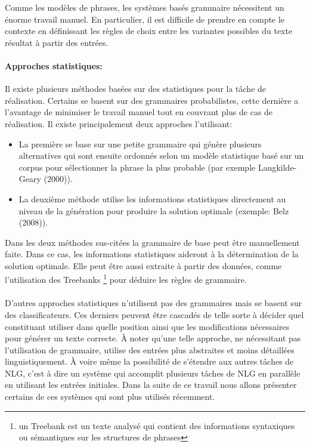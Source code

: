 Comme les modèles de phrases, les systèmes basés grammaire nécessitent un énorme travail manuel. En particulier, il est difficile de prendre en compte le contexte en définissant les règles de choix entre les variantes possibles du texte résultat à partir des entrées\cite{Gatt2018}.

\paragraph{Approches statistiques:} Il existe plusieurs méthodes basées sur des statistiques pour la tâche de réalisation. Certains se basent sur des grammaires probabilistes, cette dernière a l’avantage de minimiser le travail manuel tout en couvrant plus de cas de réalisation. Il existe principalement deux approches l’utilisant\cite{Gatt2018}:
\begin{itemize}
	\item La première se base sur une petite grammaire qui génère plusieurs alternatives qui sont ensuite ordonnés selon un modèle statistique basé sur un corpus pour sélectionner la phrase la plus probable (par exemple Langkilde-Geary (2000)\cite{LangkildeGeary2000}).
	\item La deuxième méthode utilise les informations statistiques directement au niveau de la génération pour produire la solution optimale (exemple: Belz (2008)\cite{Belz2008}).
\end{itemize}
	Dans les deux méthodes sus-citées la grammaire de base peut être manuellement faite. Dans ce cas, les informations statistiques aideront à la détermination de la solution optimale. Elle peut être aussi extraite à partir des données, comme l’utilisation des Treebanks \footnote{un Treebank est un texte analysé qui contient des informations syntaxiques ou sémantiques sur les structures de phrases} pour déduire les règles de grammaire\cite{Espinosa2008}.\newline
\paragraph{}
D’autres approches statistiques n’utilisent pas des grammaires mais se basent sur des classificateurs. Ces derniers peuvent être cascadés de telle sorte à décider quel constituant utiliser dans quelle position ainsi que les modifications nécessaires pour générer un texte correcte. À noter qu’une telle approche, ne nécessitant pas l’utilisation de grammaire, utilise des entrées plus abstraites et moins détaillées linguistiquement. À voire même la possibilité de s’étendre aux autres tâches de NLG, c’est à dire un système qui accomplit plusieurs tâches de NLG en parallèle en utilisant les entrées initiales. Dans la suite de ce travail nous allons présenter certains de ces systèmes qui sont plus utilisés récemment.

